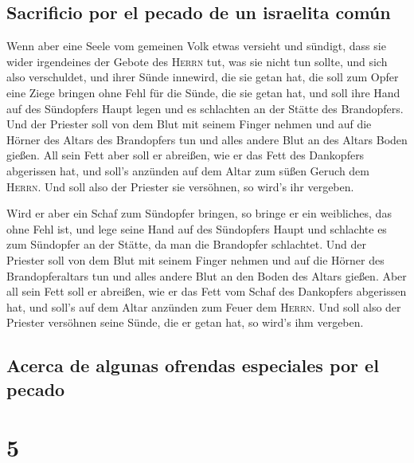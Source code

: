 \hypertarget{sacrificio-por-el-pecado-de-un-israelita-comuxfan}{%
\subsection{Sacrificio por el pecado de un israelita
común}\label{sacrificio-por-el-pecado-de-un-israelita-comuxfan}}

 Wenn aber eine Seele vom gemeinen Volk etwas versieht
und sündigt, dass sie wider irgendeines der Gebote des \textsc{Herrn}
tut, was sie nicht tun sollte, und sich also verschuldet,
 und ihrer Sünde innewird, die sie getan hat, die soll
zum Opfer eine Ziege bringen ohne Fehl für die Sünde, die sie getan hat,
 und soll ihre Hand auf des Sündopfers Haupt legen und es
schlachten an der Stätte des Brandopfers.  Und der
Priester soll von dem Blut mit seinem Finger nehmen und auf die Hörner
des Altars des Brandopfers tun und alles andere Blut an des Altars Boden
gießen.  All sein Fett aber soll er abreißen, wie er das
Fett des Dankopfers abgerissen hat, und soll's anzünden auf dem Altar
zum süßen Geruch dem \textsc{Herrn}. Und soll also der Priester sie
versöhnen, so wird's ihr vergeben.

 Wird er aber ein Schaf zum Sündopfer bringen, so bringe
er ein weibliches, das ohne Fehl ist,  und lege seine
Hand auf des Sündopfers Haupt und schlachte es zum Sündopfer an der
Stätte, da man die Brandopfer schlachtet.  Und der
Priester soll von dem Blut mit seinem Finger nehmen und auf die Hörner
des Brandopferaltars tun und alles andere Blut an den Boden des Altars
gießen.  Aber all sein Fett soll er abreißen, wie er das
Fett vom Schaf des Dankopfers abgerissen hat, und soll's auf dem Altar
anzünden zum Feuer dem \textsc{Herrn}. Und soll also der Priester
versöhnen seine Sünde, die er getan hat, so wird's ihm vergeben.

\hypertarget{acerca-de-algunas-ofrendas-especiales-por-el-pecado}{%
\subsection{Acerca de algunas ofrendas especiales por el
pecado}\label{acerca-de-algunas-ofrendas-especiales-por-el-pecado}}

\hypertarget{section-4}{%
\section{5}\label{section-4}}

